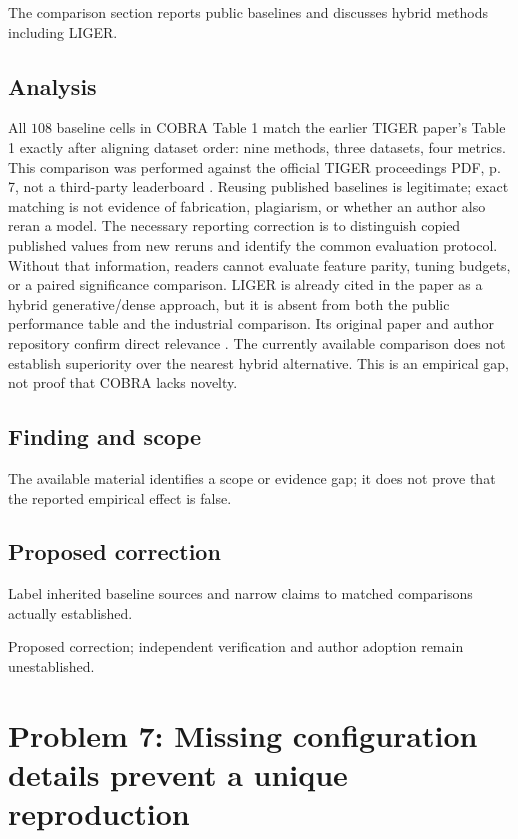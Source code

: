 \documentclass[11pt]{article}
\begin{document}
The comparison section reports public baselines and discusses hybrid methods including LIGER.

\subsection*{Analysis}

All \(108\) baseline cells in COBRA Table 1 match the earlier TIGER paper's Table 1 exactly after aligning dataset order: nine methods, three datasets, four metrics. This comparison was performed against the official TIGER proceedings PDF, p. 7, not a third-party leaderboard . Reusing published baselines is legitimate; exact matching is not evidence of fabrication, plagiarism, or whether an author also reran a model. The necessary reporting correction is to distinguish copied published values from new reruns and identify the common evaluation protocol. Without that information, readers cannot evaluate feature parity, tuning budgets, or a paired significance comparison. LIGER is already cited in the paper as a hybrid generative/dense approach, but it is absent from both the public performance table and the industrial comparison. Its original paper and author repository confirm direct relevance . The currently available comparison does not establish superiority over the nearest hybrid alternative. This is an empirical gap, not proof that COBRA lacks novelty.

\subsection*{Finding and scope}

The available material identifies a scope or evidence gap; it does not prove that the reported empirical effect is false.

\subsection*{Proposed correction}

Label inherited baseline sources and narrow claims to matched comparisons actually established.

Proposed correction; independent verification and author adoption remain unestablished.

\section*{Problem 7: Missing configuration details prevent a unique reproduction}
\end{document}
